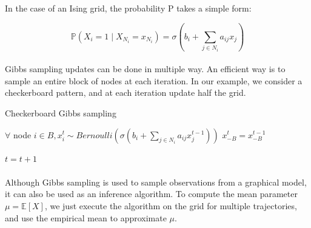 \documentclass[a4paper]{article}
\begin{document}

    In the case of an Ising grid, the probability $\mathrm{P}$ takes a simple form:
        

    \begin{equation*}
        \mathbb{P}(X_i = 1 \mid X_{N_i}=x_{N_i}) = \sigma(b_i + \sum_{j \in N_i} a_{ij}x_j)
    \end{equation*}
    
    \paragraph{}
    Gibbs sampling updates can be done in multiple way. An efficient way is to sample an entire block of nodes at each iteration. In our example, we consider a checkerboard pattern, and at each iteration update half the grid.
    
    \begin{algorithm}
        \caption{Checkerboard Gibbs sampling}
        \label{algo:gibbs}
         {
            {
                $\forall$ node $i \in B, x_i^t \sim Bernoulli(\sigma(b_i + \sum_{j \in N_i} a_{ij}x_j^{t-1}))$\;
            }
            {
                $x_{-B}^t = x_{-B}^{t-1}$\;
            }
        

            {
                $t=t+1$\;
            }
        }

    \end{algorithm}

    \paragraph{}
    Although Gibbs sampling is used to sample observations from a graphical model, it can also be used as an inference algorithm. To compute the mean parameter $\mu = \mathbb{E}[X]$, we just execute the algorithm on the grid for multiple trajectories, and use the empirical mean to approximate $\mu$.
    
\end{document}
